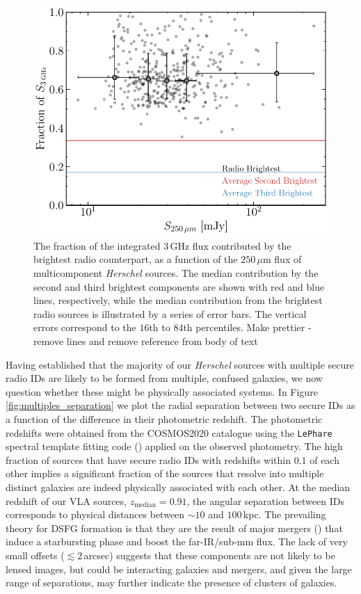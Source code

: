 \begin{figure}
	\centering
	\includegraphics[width=0.8\columnwidth]{Figures/multiples_flux_contribution.pdf}
	\caption[Contribution to total radio flux from multicomponent radio sources]{The fraction of the integrated $3\,$GHz flux contributed by the brightest radio counterpart, as a function of the $250\,\mu$m flux of multicomponent \textit{Herschel} sources. The median contribution by the second and third brightest components are shown with red and blue lines, respectively, while the median contribution from the brightest radio sources is illustrated by a series of error bars. The vertical errors correspond to the $16$th to $84$th percentiles. {\color{red}Make prettier - remove lines and remove reference from body of text}}
	\label{fig:multiples_flux_contribution}
\end{figure}

Having established that the majority of our \textit{Herschel} sources with multiple secure radio IDs are likely to be formed from multiple, confused galaxies, we now question whether these might be physically associated systems. In Figure \ref{fig:multiples_separation} we plot the radial separation between two secure IDs as a function of the difference in their photometric redshift. The photometric redshifts were obtained from the COSMOS2020 catalogue using the \texttt{LePhare} spectral template fitting code (\citealt{Arnouts_1999, Ilbert_2006}) applied on the observed photometry. The high fraction of sources that have secure radio IDs with redshifts within $0.1$ of each other implies a significant fraction of the sources that resolve into multiple distinct galaxies are indeed physically associated with each other. At the median redshift of our VLA sources, $z_\textrm{median} = 0.91$, the angular separation between IDs corresponds to physical distances between $\sim 10$ and $100\,$kpc. The prevailing theory for DSFG formation is that they are the result of major mergers (\citealt{Ivison_2002, Smail_2004, Ivison_2007, Engel_2010, Hayward_2011}) that induce a starbursting phase and boost the far-IR/sub-mm flux. The lack of very small offsets ($\lesssim 2\,$arcsec) suggests that these components are not likely to be lensed images, but could be interacting galaxies and mergers, and given the large range of separations, may further indicate the presence of clusters of galaxies.

